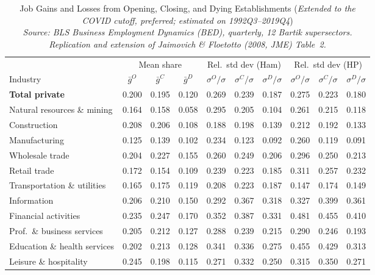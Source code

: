 \documentclass[authoryear, review, 12pt]{elsarticle}
\begin{document}
	\begin{table}[H]
\centering
\small
\caption{Job Gains and Losses from Opening, Closing, and Dying Establishments (\emph{Extended to the COVID cutoff, preferred; estimated on 1992Q3--2019Q4}) \\[2pt]
  {\small\itshape Source: BLS Business Employment Dynamics (BED), quarterly, 12 Bartik supersectors. Replication and extension of Jaimovich \& Floetotto (2008, JME) Table~2.}}
\label{tab:jf_t2_ext_2019}
\begin{tabular}{lccccccccc}
\toprule
 & \multicolumn{3}{c}{Mean share} & \multicolumn{3}{c}{Rel.\ std dev (Ham)} & \multicolumn{3}{c}{Rel.\ std dev (HP)} \\
\cmidrule(lr){2-4}\cmidrule(lr){5-7}\cmidrule(lr){8-10}
Industry & $\bar{g}^O$ & $\bar{g}^C$ & $\bar{g}^D$ & $\sigma^O/\sigma$ & $\sigma^C/\sigma$ & $\sigma^D/\sigma$ & $\sigma^O/\sigma$ & $\sigma^C/\sigma$ & $\sigma^D/\sigma$ \\
\midrule
\midrule
\textbf{Total private} & 0.200 & 0.195 & 0.120 & 0.269 & 0.239 & 0.187 & 0.275 & 0.223 & 0.180 \\
Natural resources \& mining & 0.164 & 0.158 & 0.058 & 0.295 & 0.205 & 0.104 & 0.261 & 0.215 & 0.118 \\
Construction & 0.208 & 0.206 & 0.108 & 0.188 & 0.198 & 0.139 & 0.212 & 0.192 & 0.133 \\
Manufacturing & 0.125 & 0.139 & 0.102 & 0.234 & 0.123 & 0.092 & 0.260 & 0.119 & 0.091 \\
Wholesale trade & 0.204 & 0.227 & 0.155 & 0.260 & 0.249 & 0.206 & 0.296 & 0.250 & 0.213 \\
Retail trade & 0.172 & 0.154 & 0.109 & 0.239 & 0.223 & 0.185 & 0.311 & 0.257 & 0.232 \\
Transportation \& utilities & 0.165 & 0.175 & 0.119 & 0.208 & 0.223 & 0.187 & 0.147 & 0.174 & 0.149 \\
Information & 0.206 & 0.210 & 0.150 & 0.292 & 0.367 & 0.318 & 0.327 & 0.399 & 0.361 \\
Financial activities & 0.235 & 0.247 & 0.170 & 0.352 & 0.387 & 0.331 & 0.481 & 0.455 & 0.410 \\
Prof.~\& business services & 0.205 & 0.212 & 0.127 & 0.288 & 0.239 & 0.215 & 0.290 & 0.246 & 0.193 \\
Education \& health services & 0.202 & 0.213 & 0.128 & 0.341 & 0.336 & 0.275 & 0.455 & 0.429 & 0.313 \\
Leisure \& hospitality & 0.245 & 0.198 & 0.115 & 0.271 & 0.332 & 0.250 & 0.315 & 0.350 & 0.271 \\

\end{tabular}
\end{table}
\end{document}
